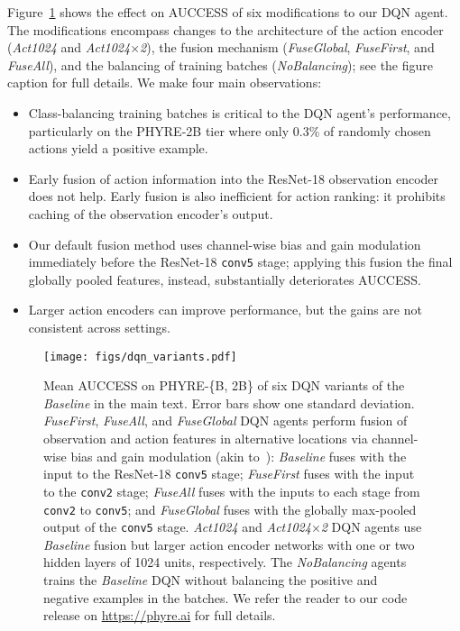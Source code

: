 \documentclass{article}
\begin{document}
\label{sec:dqn_ablation}
Figure~\ref{fig:dqn_variants} shows the effect on AUCCESS of six modifications to our DQN agent. The modifications encompass changes to the architecture of the action encoder (\emph{Act1024} and \emph{Act1024$\times$2}), the fusion mechanism (\emph{FuseGlobal}, \emph{FuseFirst}, and \emph{FuseAll}), and the balancing of training batches (\emph{NoBalancing});
see the figure caption for full details. We make four main observations:
\begin{itemize}[leftmargin=*]
\setlength\itemsep{0em}
\item Class-balancing training batches is critical to the DQN agent's performance, particularly on the PHYRE-2B tier where only 0.3\% of randomly chosen actions yield a positive example.
\item Early fusion of action information into the ResNet-18 observation encoder does not help. Early fusion is also inefficient for action ranking: it prohibits caching of the observation encoder's output.
\item Our default fusion method uses channel-wise bias and gain modulation immediately before the ResNet-18 \texttt{conv5} stage; applying this fusion the final globally pooled features, instead, substantially deteriorates AUCCESS.
\item Larger action encoders can improve performance, but the gains are not consistent across settings.
\end{itemize}
\begin{figure}[!h]
\centering
\texttt{[image: figs/dqn\_variants.pdf]}
  \caption{Mean AUCCESS on PHYRE-\{B, 2B\} of six DQN variants of the \emph{Baseline} in the main text. Error bars show one standard deviation. \emph{FuseFirst}, \emph{FuseAll}, and \emph{FuseGlobal} DQN agents perform fusion of observation and action features in alternative locations via channel-wise bias and gain modulation (akin to~\cite{perez2018film}): \emph{Baseline} fuses with the input to the ResNet-18 \texttt{conv5} stage; \emph{FuseFirst} fuses with the input to the \texttt{conv2} stage; \emph{FuseAll} fuses with the inputs to each stage from \texttt{conv2} to \texttt{conv5}; and \emph{FuseGlobal} fuses with the globally max-pooled output of the \texttt{conv5} stage. \emph{Act1024} and \emph{Act1024$\times$2} DQN agents use \emph{Baseline} fusion but larger action encoder networks with one or two hidden layers of 1024 units, respectively. The \emph{NoBalancing} agents trains the \emph{Baseline} DQN without balancing the positive and negative examples in the batches. We refer the reader to our code release on \url{https://phyre.ai} for full details.}
\label{fig:dqn_variants}
\end{figure}
\end{document}
